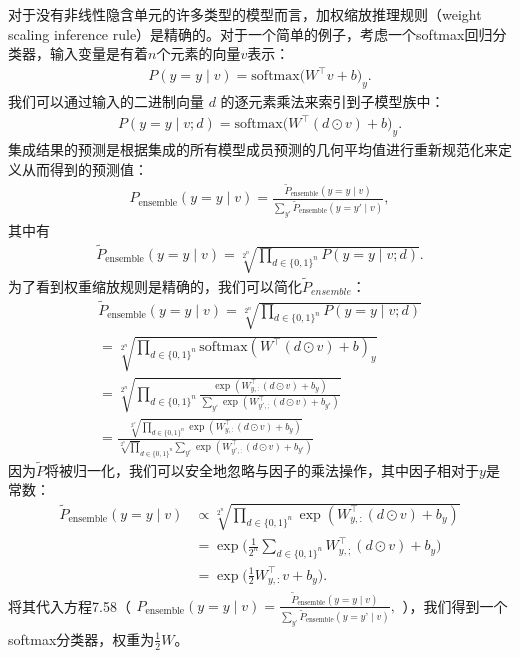 对于没有非线性隐含单元的许多类型的模型而言，加权缩放推理规则（weight scaling inference rule）是精确的。对于一个简单的例子，考虑一个softmax回归分类器，输入变量是有着$n$个元素的向量$v$表示：
$$
\begin{aligned}
P(y = y \mid v) = \text{softmax}\big(W^\top v + b \big)_y.
\end{aligned}
$$
我们可以通过输入的二进制向量 $d$ 的逐元素乘法来索引到子模型族中：
$$
\begin{aligned}
P(y = y \mid v; d) = \text{softmax}\big(W^\top(d \odot v) + b \big)_y.
\end{aligned}
$$
集成结果的预测是根据集成的所有模型成员预测的几何平均值进行重新规范化来定义从而得到的预测值：
$$
\begin{aligned}
P_{\text{ensemble}}(y = y \mid v) = \frac{\tilde{P}_{\text{ensemble}}(y = y \mid v)}
{\sum_{y'}\tilde{P}_{\text{ensemble}}(y = y' \mid v) },
\end{aligned}
$$
其中有
$$
\begin{aligned}
\tilde{P}_{\text{ensemble}}(y=y \mid v) =
\sqrt[2^n]{\prod_{d \in \{0,1\}^n} P(y = y \mid v; d)}.
\end{aligned}
$$
为了看到权重缩放规则是精确的，我们可以简化$\widetilde{P}_{ensemble}$：
$$
\begin{aligned}
\tilde{P}_{\text{ensemble}}(y=y \mid v) =
\sqrt[2^n]{\prod_{d \in \{0,1\}^n} P(y = y \mid v; d)} \\
= \sqrt[2^n]{\prod_{d \in \{0,1\}^n} \text{softmax}(W^\top(d \odot v) + b)_y} \\
= \sqrt[2^n]{\prod_{d \in \{0,1\}^n} \frac{\exp (W_{y,:}^\top(d \odot v) + b_y)}
{\sum_{y'}\exp (W_{y',;}^\top(d \odot v) + b_{y'})}}\\
= \frac{\sqrt[2^n]{\prod_{d \in \{0,1\}^n}\exp (W_{y,:}^\top(d \odot v) + b_y)}}
{ \sqrt[2^n] \prod_{d \in \{0,1\}^n} \sum_{y'}\exp (W_{y',:}^\top(d \odot v) + b_{y'})}
\end{aligned}
$$
因为$\widetilde{P}$将被归一化，我们可以安全地忽略与因子的乘法操作，其中因子相对于$y$是常数：
$$
\begin{aligned}
\tilde{P}_{\text{ensemble}}(y=y \mid v) &\propto
\sqrt[2^n]{\prod_{d \in \{0,1\}^n} \exp (W_{y,:}^\top(d \odot v) + b_y)} \\
& = \exp \Bigg(\frac{1}{2^n} \sum_{d \in \{0,1\}^n} W_{y,;}^\top(d \odot v) + b_y \Bigg) \\
& = \exp \Big(\frac{1}{2}W_{y,:}^\top v + b_y \Big) .
\end{aligned}
$$
将其代入方程7.58（$\begin{aligned} P_{\text{ensemble}}(y = y \mid v) = \frac{\tilde{P}_{\text{ensemble}}(y = y \mid v)} {\sum_{y’}\tilde{P}_{\text{ensemble}}(y = y’ \mid v) }, \end{aligned}$），我们得到一个softmax分类器，权重为$\frac{1}{2}W$。

